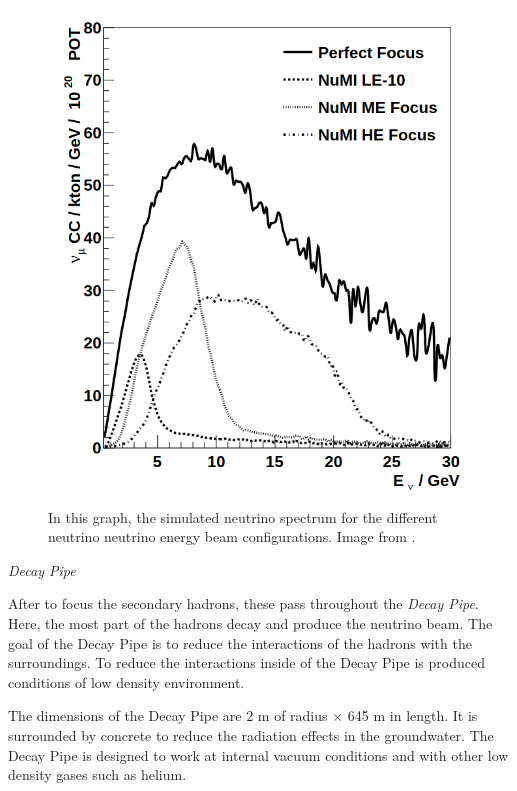\begin{figure}[!htb]
\centering
\includegraphics[scale=0.3]{Figures/Chapter2/nuAllSpectrums.png}
        \caption{In this graph, the simulated neutrino spectrum for the different neutrino neutrino energy beam configurations. Image from \cite{Numi}.} 
\label{fig:MnvExp:NuMI:Neutrino spectrum}
\end{figure}

\textit{Decay Pipe}

After to focus the secondary hadrons, these pass throughout the \textit{Decay Pipe}. Here, the most part of the hadrons decay and produce the neutrino beam. The goal of the Decay Pipe is to reduce the interactions of the hadrons with the surroundings. To reduce the interactions inside of the Decay Pipe is produced conditions of low density environment. 

The dimensions of the Decay Pipe are 2 m of radius $\times$ 645 m in length. It is surrounded by concrete to reduce the radiation effects in the groundwater. The Decay Pipe is designed to work at internal vacuum conditions and with other low density gases such as helium. 

